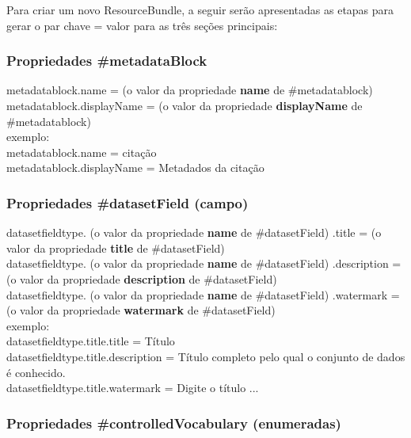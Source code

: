 \documentclass[12pt,hidelinks]{article}
\begin{document}
Para criar um novo ResourceBundle, a seguir serão apresentadas as etapas para gerar o par chave = valor para as três seções principais:

\subsubsection{Propriedades \#metadataBlock}

\qquad metadatablock.name = (o valor da propriedade \textbf{name} de \#metadatablock)\\

metadatablock.displayName = (o valor da propriedade \textbf{displayName} de \#metadatablock)\\

exemplo:\\

metadatablock.name = citação\\

metadatablock.displayName = Metadados da citação

\subsubsection{Propriedades \#datasetField (campo)}

\qquad datasetfieldtype. (o valor da propriedade \textbf{name} de \#datasetField) .title = (o valor da propriedade \textbf{title} de \#datasetField)\\

datasetfieldtype. (o valor da propriedade \textbf{name} de \#datasetField) .description = (o valor da propriedade \textbf{description} de \#datasetField)\\

datasetfieldtype. (o valor da propriedade \textbf{name} de \#datasetField) .watermark = (o valor da propriedade \textbf{watermark} de \#datasetField)\\

exemplo:\\

datasetfieldtype.title.title = Título\\

datasetfieldtype.title.description = Título completo pelo qual o conjunto de dados é conhecido.\\

datasetfieldtype.title.watermark = Digite o título ...

\subsubsection{Propriedades \#controlledVocabulary (enumeradas)}
\end{document}
